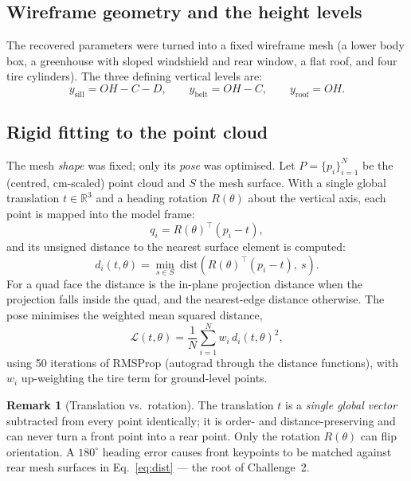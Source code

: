 \documentclass[11pt]{article}
\newcommand{\OH}{\mathit{OH}}
\theoremstyle{definition}
\newtheorem{remark}{Remark}
\begin{document}
\subsection{Wireframe geometry and the height levels}

The recovered parameters were turned into a fixed wireframe mesh (a lower body box, a greenhouse with sloped windshield and rear window, a flat roof, and four tire cylinders). The three defining vertical levels are:
\begin{equation}
y_{\text{sill}} = \OH - C - D, \qquad
y_{\text{belt}} = \OH - C, \qquad
y_{\text{roof}} = \OH.
\label{eq:heights}
\end{equation}

\subsection{Rigid fitting to the point cloud}

The mesh \emph{shape} was fixed; only its \emph{pose} was optimised. Let $P = \{p_i\}_{i=1}^N$ be the (centred, cm-scaled) point cloud and $S$ the mesh surface. With a single global translation $t \in \mathbb{R}^3$ and a heading rotation $R(\theta)$ about the vertical axis, each point is mapped into the model frame:
\begin{equation}
q_i = R(\theta)^{\top}(p_i - t),
\end{equation}
and its unsigned distance to the nearest surface element is computed:
\begin{equation}
d_i(t,\theta) = \min_{s \in S}\ \text{dist}\!\left(R(\theta)^{\top}(p_i - t),\ s\right).
\label{eq:dist}
\end{equation}
For a quad face the distance is the in-plane projection distance when the projection falls inside the quad, and the nearest-edge distance otherwise. The pose minimises the weighted mean squared distance,
\begin{equation}
\mathcal{L}(t,\theta) = \frac{1}{N}\sum_{i=1}^{N} w_i\, d_i(t,\theta)^2,
\label{eq:loss}
\end{equation}
using 50 iterations of RMSProp (autograd through the distance functions), with $w_i$ up-weighting the tire term for ground-level points.

\begin{remark}[Translation vs.\ rotation]
The translation $t$ is a \emph{single global vector} subtracted from every point identically; it is order- and distance-preserving and can never turn a front point into a rear point. Only the rotation $R(\theta)$ can flip orientation. A $180^\circ$ heading error causes front keypoints to be matched against rear mesh surfaces in Eq.~\eqref{eq:dist} --- the root of Challenge~2.
\end{remark}
\end{document}

